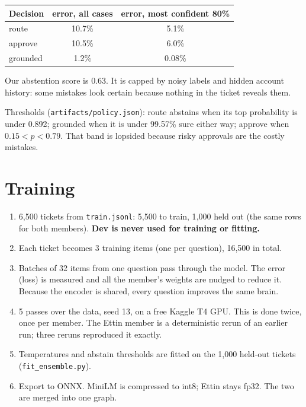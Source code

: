 \documentclass[11pt,a4paper]{article}
\begin{document}
\begin{center}
\begin{tabular}{lcc}
\toprule
Decision & error, all cases & error, most confident 80\% \\
\midrule
route & 10.7\% & 5.1\% \\
approve & 10.5\% & 6.0\% \\
grounded & 1.2\% & 0.08\% \\
\bottomrule
\end{tabular}
\end{center}
Our abstention score is 0.63. It is capped by noisy labels and hidden account history:
some mistakes look certain because nothing in the ticket reveals them.

Thresholds (\texttt{artifacts/policy.json}): route abstains when its top probability is
under 0.892; grounded when it is under 99.57\% sure either way; approve when
$0.15 < p < 0.79$. That band is lopsided because risky approvals are the costly mistakes.

\section{Training}
\begin{enumerate}
  \item 6{,}500 tickets from \texttt{train.jsonl}: 5{,}500 to train, 1{,}000 held out (the
        same rows for both members). \textbf{Dev is never used for training or fitting.}
  \item Each ticket becomes 3 training items (one per question), 16{,}500 in total.
  \item Batches of 32 items from one question pass through the model. The error (loss)
        is measured and all the member's weights are nudged to reduce it. Because the
        encoder is shared, every question improves the same brain.
  \item 5 passes over the data, seed 13, on a free Kaggle T4 GPU. This is done twice,
        once per member. The Ettin member is a deterministic rerun of an earlier run;
        three reruns reproduced it exactly.
  \item Temperatures and abstain thresholds are fitted on the 1{,}000 held-out
        tickets (\texttt{fit\_ensemble.py}).
  \item Export to ONNX. MiniLM is compressed to int8; Ettin stays fp32. The two are merged
        into one graph.
\end{enumerate}
\end{document}
